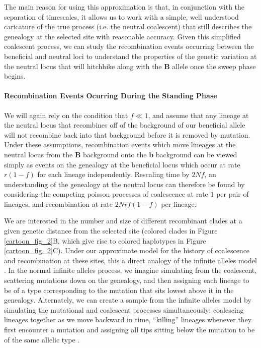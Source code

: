 \documentclass[a4paper,10pt]{article}
\begin{document}
The main reason for using this approximation is that, in conjunction with the separation of timescales, it allows us to work with a simple, well understood caricature of the true process (i.e. the neutral coalescent) that still describes the genealogy at the selected site with reasonable accuracy. Given this simplified coalescent process, we can study the recombination events occurring between the beneficial and neutral loci to understand the properties of the genetic variation at the neutral locus that will hitchhike along with the \textbf{B} allele once the sweep phase begins.

\paragraph{Recombination Events Ocurring During the Standing Phase}

We will again rely on the condition that $f \ll 1$, and assume that any lineage at the neutral locus that recombines off of the background of our beneficial allele will not recombine back into that background before it is removed by mutation. Under these assumptions, recombination events which move lineages at the neutral locus from the \textbf{B} background onto the \textbf{b} background can be viewed simply as events on the genealogy at the beneficial locus which occur at rate $r\left(1-f\right)$ for each lineage independently. Rescaling time by $2Nf$, an understanding of the genealogy at the neutral locus can therefore be found by considering the competing poisson processes of coalescence at rate $1$ per pair of lineages, and recombination at rate $2Nrf(1-f)$ per lineage.

We are interested in the number and size of different recombinant clades at a given genetic distance from the selected site (colored clades in Figure \ref{cartoon_fig_2}B, which give rise to colored haplotypes in Figure \ref{cartoon_fig_2}C). Under our approximate model for the history of coalescence and recombination at these sites, this a direct analogy of the infinite alleles model \citep{Kimura:1964wb,Watterson:1984wb}. In the normal infinite alleles process, we imagine simulating from the coalescent, scattering mutations down on the genealogy, and then assigning each lineage to be of a type corresponding to the mutation that sits lowest above it in the genealogy. Alternately, we can create a sample from the infinite alleles model by simulating the mutational and coalescent processes simultaneously: coalescing lineages together as we move backward in time, ``killing'' lineages whenever they first encounter a mutation and assigning all tips sitting below the mutation to be of the same allelic type \citep{Griffiths:1980wy}.
\end{document}
